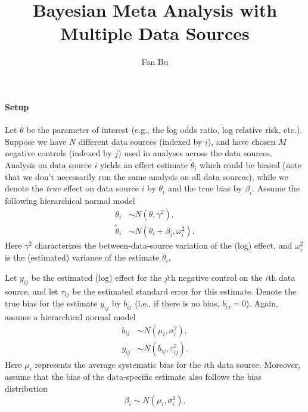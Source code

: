 \documentclass{article}
\title{Bayesian Meta Analysis with Multiple Data Sources}
\author{Fan Bu}
\date{}
\begin{document}
\maketitle


\paragraph{Setup}
Let $\theta$ be the parameter of interest (e.g., the log odds ratio, log relative risk, etc.). Suppose we have $N$ different data sources (indexed by $i$), and have chosen $M$ negative controls (indexed by $j$) used in analyses across the data sources. Analysis on data source $i$ yields an effect estimate $\tilde{\theta}_i$ which could be biased (note that we don't necessarily run the same analysis on all data sources), while we denote the \emph{true} effect on data source $i$ by $\theta_i$ and the true bias by $\beta_i$. Assume the following hierarchical normal model
\begin{align}
    \theta_i &\sim N(\theta, \gamma^2),\\
    \tilde\theta_i &\sim N(\theta_i + \beta_i, \omega_i^2).
\end{align}
Here $\gamma^2$ characterizes the between-data-source variation of the (log) effect, and $\omega_i^2$ is the (estimated) variance of the estimate $\tilde\theta_i$. 

Let $y_{ij}$ be the estimated (log) effect for the $j$th negative control on the $i$th data source, and let $\tau_{ij}$ be the estimated standard error for this estimate. Denote the true bias for the estimate $y_{ij}$ by $b_{ij}$ (i.e., if there is no bias, $b_{ij} = 0$). Again, assume a hierarchical normal model
\begin{align}
    b_{ij} &\sim N(\mu_i, \sigma_i^2),\\
    y_{ij} &\sim N(b_{ij}, \tau_{ij}^2).
\end{align}
Here $\mu_i$ represents the average systematic bias for the $i$th data source. Moreover, assume that the bias of the data-specific estimate also follows the bias distribution
\begin{equation}
    \beta_i \sim N(\mu_i, \sigma_i^2).
\end{equation}
\end{document}
